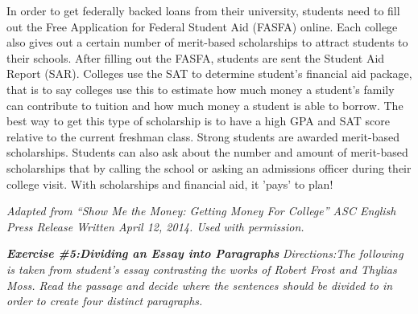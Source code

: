 \begin{spacing}{2}
\begin{linenumbers*}
\indent In order to get federally backed loans from their university, students need to fill out the Free Application for Federal Student Aid (FASFA) online. Each college also gives out a certain number of merit-based scholarships to attract students to their schools. After filling out the FASFA, students are sent the Student Aid Report (SAR).  Colleges use the SAT to determine student's financial aid package, that is to say colleges use this to estimate how much money a student's family can contribute to tuition and how much money a student is able to borrow. The best way to get this type of scholarship is to have a high GPA and SAT score relative to the current freshman class. Strong students are awarded merit-based scholarships. Students can also ask about the number and amount of merit-based scholarships that by calling the school or asking an admissions officer during their college visit. With scholarships and financial aid, it 'pays' to plan!
\end{linenumbers*}
\end{spacing}

\textit{Adapted from “Show Me the Money: Getting Money For College” ASC English Press Release Written April 12, 2014. Used with permission.} 


\bigskip
\textbf\textit{Exercise \#5:Dividing an Essay into Paragraphs}
\bigskip
\textit{Directions:The following is taken from student's essay contrasting the works of Robert Frost and Thylias Moss. Read the passage and decide where the sentences should be divided to in order to create four distinct paragraphs. }

